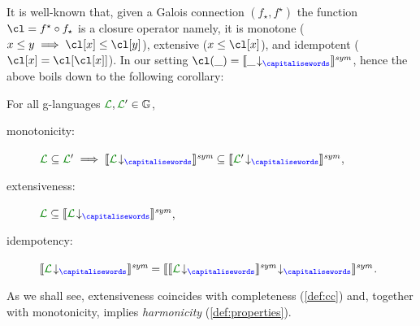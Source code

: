 It is well-known that, given a Galois connection $(f_\star,f^\star)$
the function $\cl = f^\star \circ f_\star$ is a closure operator
namely, it is monotone ($x \leq y \implies \cl[x] \leq \cl[y]$),
extensive ($x \leq \cl[x]$), and idempotent
($\cl[x] = \cl[{\cl[x]}]$).
%
In our setting $\cl(\_) = \ssem{\proj \_ {}}$, hence the above boils down
to the following corollary:
\begin{corollary}\label{fac:clgc}
  For all g-languages $\clang, \clang' \in \glanguages$,
  \begin{description}
  \item[monotonicity:]
	 $\clang \subseteq \clang' \implies \ssem{\proj \clang {}}
	 \subseteq \ssem{\proj{\clang'} {}}$,
  \item[extensiveness:] $\clang \subseteq \ssem{\proj{\clang}{}}$,
  \item[idempotency:] $\ssem{{\proj \clang {}}} = \ssem{\proj{\ssem{\proj{\clang}{}}}{}}$.
  \end{description}
\end{corollary}
%
As we shall see, extensiveness coincides with completeness
(\cref{def:cc}) and, together with monotonicity, implies
\emph{harmonicity} (\cref{def:properties}).

